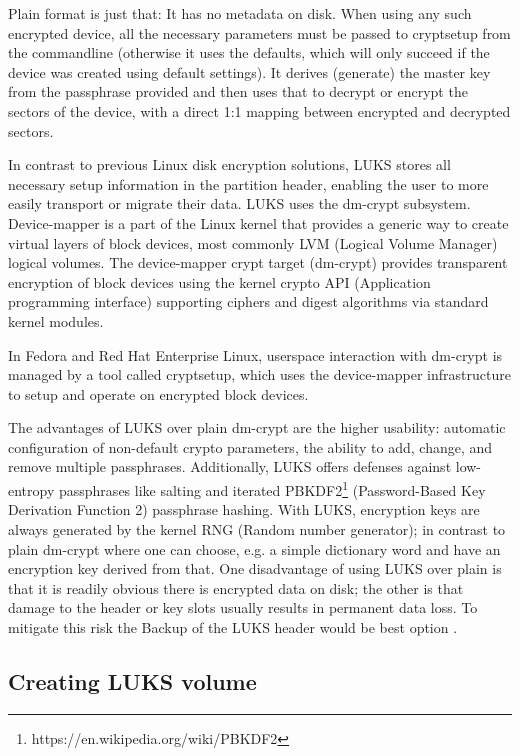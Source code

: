 Plain format is just that: It has no metadata on disk.
When using any such encrypted device, all the necessary parameters must be passed to cryptsetup from the commandline (otherwise it uses the defaults, which will only succeed if the device was created using default settings).
It derives (generate) the master key from the passphrase provided and then uses that to decrypt or encrypt the sectors of the device, with a direct 1:1 mapping between encrypted and decrypted sectors.

In contrast to previous Linux disk encryption solutions, LUKS stores all necessary setup information in the partition header, enabling the user to more easily transport or migrate their data.
LUKS uses the dm-crypt subsystem.
Device-mapper is a part of the Linux kernel that provides a generic way to create virtual layers of block devices, most commonly LVM (Logical Volume Manager) logical volumes.
The device-mapper crypt target (dm-crypt) provides transparent encryption of block devices using the kernel crypto API (Application programming interface) supporting ciphers and digest algorithms via standard kernel modules.

In Fedora and Red Hat Enterprise Linux, userspace interaction with dm-crypt is managed by a tool called cryptsetup, which uses the device-mapper infrastructure to setup and operate on encrypted block devices.

The advantages of LUKS over plain dm-crypt are the higher usability: automatic configuration of non-default crypto parameters, the ability to add, change, and remove multiple passphrases.
Additionally, LUKS offers defenses against low-entropy passphrases like salting and iterated PBKDF2\footnote{https://en.wikipedia.org/wiki/PBKDF2} (Password-Based Key Derivation Function 2) passphrase hashing.
With LUKS, encryption keys are always generated by the kernel RNG (Random number generator); in contrast to plain dm-crypt where one can choose, e.g. a simple dictionary word and have an encryption key derived from that.
One disadvantage of using LUKS over plain is that it is readily obvious there is encrypted data on disk; the other is that damage to the header or key slots usually results in permanent data loss.
To mitigate this risk the Backup of the LUKS header would be best option \cite{fruhwirth2005luks}.

\subsection{Creating LUKS volume}\label{createLUKS}

